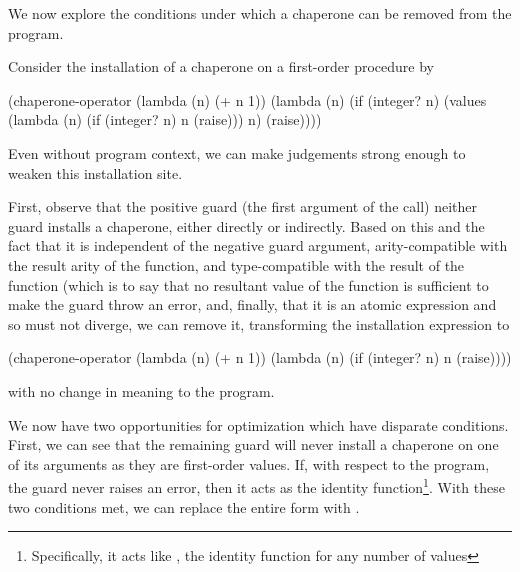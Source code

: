 \documentclass{sigplanconf}
\begin{document}

We now explore the conditions under which a chaperone can be removed from the program.

Consider the installation of a chaperone on a first-order procedure by
\begin{schemedisplay}
(chaperone-operator
 (lambda (n) (+ n 1))
 (lambda (n)
    (if (integer? n)
        (values (lambda (n)
                  (if (integer? n)
                      n
                      (raise)))
                n)
        (raise))))
\end{schemedisplay}
Even without program context, we can make judgements strong enough to weaken this installation site.

First, observe that the positive guard (the first argument of the  call) neither guard installs a chaperone, either directly or indirectly.
Based on this and the fact that it is independent of the negative guard argument, arity-compatible with the result arity of the function, and type-compatible with the result of the function (which is to say that no resultant value of the function is sufficient to make the guard throw an error, and, finally, that it is an atomic expression and so must not diverge, we can remove it, transforming the installation expression to
\begin{schemedisplay}
(chaperone-operator
 (lambda (n) (+ n 1))
 (lambda (n)
    (if (integer? n)
        n
        (raise))))
\end{schemedisplay}
with no change in meaning to the program.

We now have two opportunities for optimization which have disparate conditions.
First, we can see that the remaining guard will never install a chaperone on one of its arguments as they are first-order values.
If, with respect to the program, the guard never raises an error, then it acts as the identity function\footnote{Specifically, it acts like , the identity function for any number of values}.
With these two conditions met, we can replace the entire form with .
\end{document}
